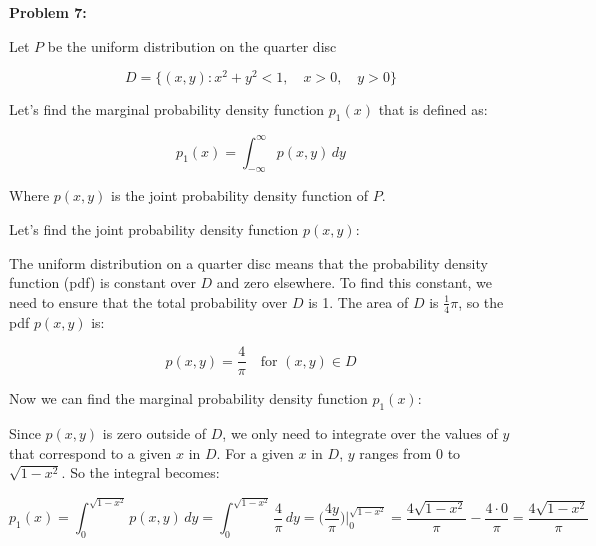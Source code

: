 \textbf{Problem 7:}

\singlespacing

Let $P$ be the uniform distribution on the quarter disc

\singlespacing

\begin{equation}
    D = \{(x, y): x^2 + y^2 < 1,\quad x > 0,\quad y > 0\}
\end{equation}

\singlespacing

Let's find the marginal probability density function $p_1(x)$ that
is defined as:

\singlespacing

\begin{equation}
    p_1(x) = \int_{-\infty}^{\infty} p(x, y) \, dy
\end{equation}

\singlespacing

Where $p(x, y)$ is the joint probability density function of $P$.

\singlespacing

Let's find the joint probability density function $p(x, y)$:

\singlespacing

The uniform distribution on a quarter disc means that the probability density function (pdf) is constant over \( D \) and zero elsewhere. To find this constant, we need to ensure that the total probability over \( D \) is 1. The area of \( D \) is \( \frac{1}{4}\pi \), so the pdf \( p(x, y) \) is:

\[ p(x, y) = \frac{4}{\pi} \quad \text{for } (x, y) \in D \]

\singlespacing

Now we can find the marginal probability density function $p_1(x)$:

\singlespacing

Since \( p(x, y) \) is zero outside of \( D \), we only need to integrate over the values of \( y \) that correspond to a given \( x \) in \( D \). For a given \( x \) in \( D \), \( y \) ranges from 0 to \( \sqrt{1 - x^2} \). So the integral becomes:

\singlespacing

\begin{equation}
    p_1(x) = \int_{0}^{\sqrt{1 - x^2}} p(x, y) \, dy = \int_{0}^{\sqrt{1 - x^2}} \frac{4}{\pi} \, dy = \Big( \frac{4y}{\pi} \Big)\Big|_{0}^{\sqrt{1 - x^2}} = \frac{4\sqrt{1 - x^2}}{\pi} - \frac{4\cdot0}{\pi} = \frac{4\sqrt{1 - x^2}}{\pi}
\end{equation}

